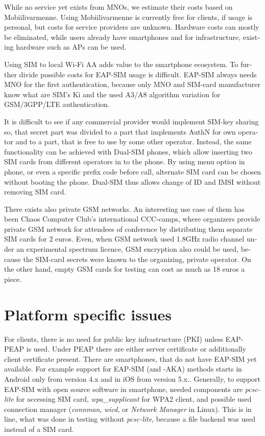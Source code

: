 \documentclass[12pt,a4paper,english]{tutthesis}
\begin{document}
\begin{otherlanguage}{english}
While no service yet exists from MNOs, we estimate their costs based
on Mobiilivarmenne. Using Mobiilivarmenne is currently free for
clients, if usage is personal, but costs for service providers are
unknown.  Hardware costs can mostly be eliminated, while users already
have smartphones and for infrastructure, existing hardware such as APs
can be used.

Using SIM to local Wi-Fi AA adds value to the smartphone ecosystem.
To further divide possible costs for EAP-SIM usage
is difficult.
EAP-SIM always needs MNO for the first authentication,
because only MNO and SIM-card manufacturer know 
what are SIM's Ki and the used A3/A8 algorithm variation
for GSM/3GPP/LTE authentication.

It is difficult to see if any commercial provider would implement
SIM-key sharing so, that secret part was divided to a part that
implements AuthN for own operator and to a part, that is free to use by
some other operator.  Instead, the same functionality can be achieved with
Dual-SIM phones, which allow inserting two SIM cards from different
operators in to the phone. By using menu option in phone, or even a
specific prefix code before call, alternate SIM card can be chosen
without booting the phone.
Dual-SIM thus allows change of ID and IMSI without removing SIM card.

There exists also private GSM networks. An interesting use case
of them  has been Chaos Computer Club's international 
CCC-camps\cite{ccc}, where organizers 
provide private GSM network for attendees of conference
by distributing them separate SIM cards for 2 euros.  Even, when GSM
network used 1.8GHz radio channel under an experimental spectrum
licence,  GSM encryption also could be used, because the SIM-card secrets were known
to the organizing, private operator.
On the other hand, empty GSM cards for testing can cost as much as 
18 euros a piece\cite{smartjac-testsim}.


\section{Platform specific issues}
\label{sec-6-3}

For clients, there is no need for public key infrastructure (PKI)
unless EAP-PEAP is used. Under PEAP there are either server
certificate or additionally client certificate present.  There are
smartphones, that do not have EAP-SIM yet available.  For example
support for EAP-SIM (and -AKA) methods starts in Android only from
version 4.x and in iOS from version 5.x.\cite{sim-support}.
\label{pcsc}
Generally, to support EAP-SIM  with open source software in 
smartphone, needed components are \emph{pcsc-lite} for accessing SIM card, \emph{wpa\_supplicant} for
WPA2 client, and possible used connection manager (\emph{connman},
\emph{wicd}, or \emph{Network Manager} in Linux). This is in line, what was done in testing without \emph{pcsc-lite},
because a file backend was used instead of a SIM card.





\end{otherlanguage}
\end{document}

